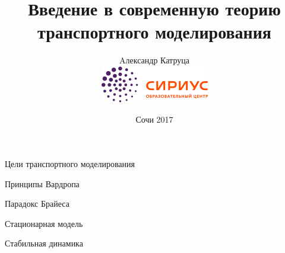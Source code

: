 \documentclass[12pt]{beamer}
\begin{document}
\title[]{Введение в современную теорию транспортного моделирования}

\author[А. Катруца]{Aлександр Катруца \\[0.5cm] 
\includegraphics[scale=0.5]{logo_sirius}}

\date{Сочи 2017}

\begin{frame}
\maketitle
\end{frame}

\begin{frame}{Цели транспортного моделирования}

\end{frame}

\begin{frame}{Принципы Вардропа}

\end{frame}

\begin{frame}{Парадокс Брайеса}

\end{frame}

\begin{frame}{Стационарная модель}

\end{frame}


\begin{frame}{Стабильная динамика}

\end{frame}
\end{document}

